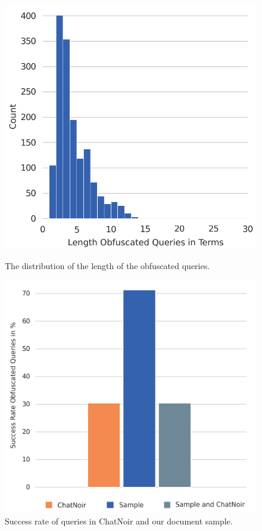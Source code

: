 \begin{figure}[b]
    \vspace*{-.5cm}
    \begin{minipage}[b][][b]{0.45\textwidth}
    \centering
    \includegraphics[width=1.0\textwidth]{graphics/evaluation/distribution_length_submitted_queries.pdf}
    \caption{The distribution of the length of the obfuscated queries.}
    \label{fig:distribution:length}
    \end{minipage}
    \hfill
    \begin{minipage}[b][][b]{0.45\textwidth}
    \centering
    \includegraphics[width=1.0\textwidth]{graphics/evaluation/successrate_users.pdf}
    \caption{Success rate of queries in ChatNoir and our document sample.}
    \label{fig:successrate:users}
    \end{minipage}
\end{figure}
